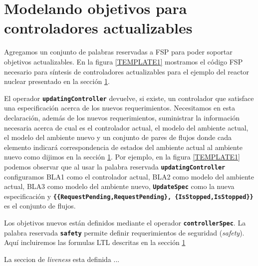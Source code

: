 \section{Modelando objetivos para controladores actualizables}

Agregamos un conjunto de palabras reservadas a FSP para poder soportar objetivos actualizables. En la figura
\ref{TEMPLATE1} mostramos el código FSP necesario para síntesis de controladores actualizables para el ejemplo del reactor nuclear
presentado en la sección \ref{}.

El operador \texttt{\textbf{updatingController}} devuelve, si existe, un controlador que satisface una especificación
acerca de los nuevos requerimientos. Necesitamos en esta declaración, además de los nuevos requerimientos, suministrar
la información necesaria acerca de cual es el controlador actual, el modelo del ambiente actual, el modelo del ambiente
nuevo y un conjunto de pares de flujos donde cada elemento indicará correspondencia de estados del ambiente actual al
ambiente nuevo como dijimos en la sección \ref{}. Por ejemplo, en la figura \ref{TEMPLATE1} podemos observar que
al usar la palabra reservada \texttt{\textbf{updatingController}} configuramos BLA1 como el controlador actual, BLA2
como modelo del ambiente actual, BLA3 como modelo del ambiente nuevo, \texttt{\textbf{UpdateSpec}} como la nueva
especificación y \texttt{\textbf{\{\{RequestPending,RequestPending\}, \{IsStopped,IsStopped\}\}}} es el conjunto de
flujos.

Los objetivos nuevos están definidos mediante el operador \texttt{\textbf{controllerSpec}}. La palabra reservada
\texttt{\textbf{safety}} permite definir requerimientos de seguridad (\emph{safety}). Aquí incluiremos las formulas
LTL descritas en la sección \ref{}

La seccion de \emph{liveness} esta definida ... 
